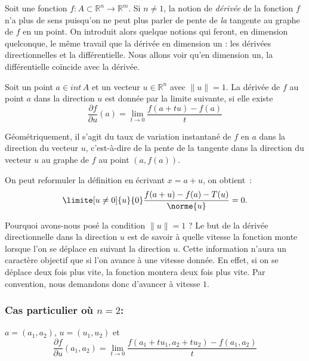 Soit une fonction $f:A\subset \mathbb{R}^n \rightarrow \mathbb{R}^m$. Si $n\neq 1$, la notion de \emph{dérivée} de la fonction $f$ n'a plus de sens puisqu'on ne peut plus parler de pente de \emph{la} tangente au graphe de $f$ en un point. On introduit alors quelque notions qui feront, en dimension quelconque, le même travail que la dérivée en dimension un : les dérivées directionnelles et la différentielle. Nous allons voir qu'en dimension un, la différentielle coïncide avec la dérivée.


\begin{definition} 
    Soit un point $a \in int\,A$ et un vecteur $u \in \mathbb{R}^n$ avec $\| u \| =1$. La dérivée de $f$ au point $a$ dans la direction $u$ est donnée par la limite suivante, si elle existe 
    \begin{equation}
        \frac{\partial f}{\partial u}(a) = \lim_{t\rightarrow 0}\frac{f(a+tu) - f(a)}{t}
    \end{equation}
\end{definition}

Géométriquement, il s'agit du taux de variation instantané de $f$ en $a$ dans la direction du vecteur $u$, c'est-à-dire de la pente de la tangente dans la direction du vecteur $u$ au graphe de $f$ au point $(a, f(a))$.

\begin{remark}
On peut reformuler la définition en écrivant $x = a + u$, on obtient~:
\begin{equation}
    \limite[u\neq 0]{u}{0} \frac{f(a+u)-f(a)-T(u)}{\norme{u}} = 0.
\end{equation}
\end{remark}

\begin{remark}
Pourquoi avons-nous posé la condition $\| u \|=1$ ? Le but de la dérivée directionnelle dans la direction $u$ est de savoir à quelle vitesse la fonction monte lorsque l'on se déplace en suivant la direction $u$. Cette information n'aura un caractère \og objectif\fg{} que si l'on avance à une vitesse donnée. En effet, si on se déplace deux fois plus vite, la fonction montera deux fois plus vite. Par convention, nous demandons donc d'avancer à vitesse $1$.
\end{remark}

\subsubsection*{Cas particulier où $n=2$:} $a = (a_1, a_2)$, $u =
(u_1,u_2)$ et
$$\frac{\partial f}{\partial u}(a_1, a_2) = \lim_{t\rightarrow
0}\frac{f(a_1+tu_1,a_2+tu_2) - f(a_1, a_2)}{t}$$

